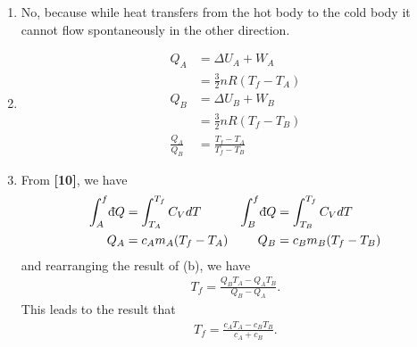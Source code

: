 \documentclass[a4paper,12pt]{article}
\def\dbar{{\mathchar'26\mkern-12mu \mathrm{d}}}
\begin{document}
\begin{enumerate}[label=\textbf{[\arabic*]}]
    \item
        \begin{enumerate}
            \item
                No, because while heat transfers from the hot body to the cold body it cannot flow spontaneously in the other direction.

            \item
                \begin{align*}
                    Q_A &= \Delta U_A + W_A \\
                    &= \frac{3}{2} nR(T_f - T_A) \\
                    Q_B &= \Delta U_B + W_B \\
                    &= \frac{3}{2} nR(T_f - T_B) \\
                    \frac{Q_A}{Q_B} &= \frac{T_f - T_A}{T_f - T_B}
                \end{align*}

            \item
                From \textbf{[10]}, we have
                \begin{align*}
                    \int_A^f \dbar Q &= \int_{T_A}^{T_f} C_V dT & \int_B^f \dbar Q &= \int_{T_B}^{T_f} C_V dT \\
                    Q_A &= c_A m_A (T_f - T_A) & Q_B &= c_B m_B (T_f - T_B)
                \end{align*}
                and rearranging the result of (b), we have
                \begin{align*}
                    T_f = \frac{Q_B T_A - Q_A T_B}{Q_B - Q_A}.
                \end{align*}
                This leads to the result that
                \begin{align*}
                    T_f = \frac{c_A T_A - c_B T_B}{c_A + c_B}.
                \end{align*}
        \end{enumerate}

\end{enumerate}
\end{document}
